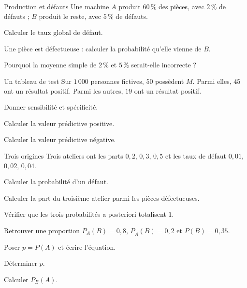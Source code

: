 \begingroup\renewcommand{\otBesoinPlace}[1]{}\begin{minipage}{\linewidth}
\begin{exercice}[2]{Production et défauts}
Une machine $A$ produit $60\,\%$ des pièces, avec $2\,\%$ de défauts ; $B$ produit le reste, avec $5\,\%$ de défauts.
\begin{questions}
\item Calculer le taux global de défaut.
\item Une pièce est défectueuse : calculer la probabilité qu’elle vienne de $B$.
\item Pourquoi la moyenne simple de $2\,\%$ et $5\,\%$ serait-elle incorrecte ?
\end{questions}
\end{exercice}
\begin{exercice}[2]{Un tableau de test}
Sur $1\,000$ personnes fictives, $50$ possèdent $M$. Parmi elles, $45$ ont un résultat positif. Parmi les autres, $19$ ont un résultat positif.
\begin{questions}
\item Donner sensibilité et spécificité.
\item Calculer la valeur prédictive positive.
\item Calculer la valeur prédictive négative.
\end{questions}
\end{exercice}
\begin{exercice}[2]{Trois origines}
Trois ateliers ont les parts $0{,}2$, $0{,}3$, $0{,}5$ et les taux de défaut $0{,}01$, $0{,}02$, $0{,}04$.
\begin{questions}
\item Calculer la probabilité d’un défaut.
\item Calculer la part du troisième atelier parmi les pièces défectueuses.
\item Vérifier que les trois probabilités a posteriori totalisent $1$.
\end{questions}
\end{exercice}
\begin{exercice}[2]{Retrouver une proportion}
$P_A(B)=0{,}8$, $P_{\bar A}(B)=0{,}2$ et $P(B)=0{,}35$.
\begin{questions}
\item Poser $p=P(A)$ et écrire l’équation.
\item Déterminer $p$.
\item Calculer $P_B(A)$.
\end{questions}
\end{exercice}
\end{minipage}\endgroup

